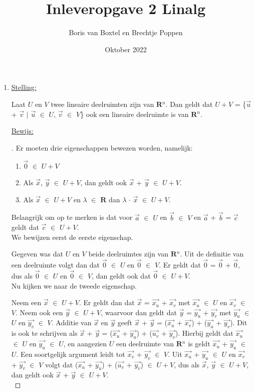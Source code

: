 \documentclass[12pt, a4paper]{article}
\title{Inleveropgave 2 Linalg}
\author{Boris van Boxtel en Brechtje Poppen}
\date{Oktober 2022}
\begin{document}
\maketitle 

\begin{enumerate}[(a.)]
\item  \underline{Stelling:} \newline 

Laat $U$ en $V$ twee lineaire deelruimten zijn van $\mathbf{R}$$^n$. Dan geldt dat $U + V$ = \{$\vec u$ + $\vec v$ $\vert$ $\vec u$ $\in$ $U$, $\vec v$ $\in$ $V$\} ook een lineaire deelruimte is van $\mathbf{R}$$^n$. \newline

\underline{Bewijs:}\begin{proof}[\unskip\nopunct]
Er moeten drie eigenschappen bewezen worden, namelijk:
\begin{enumerate}[1.]
\item $\vec{0}$ $\in$ $U + V$
\item Als $\vec{x}$, $\vec{y}$ $\in$ $U + V$, dan geldt ook $\vec{x}$ + $\vec{y}$ $\in$ $U + V$.
\item Als $\vec{x}$ $\in$ $U + V$ en $\lambda$ $\in$ $\mathbf{R}$ dan $\lambda$ $\cdot$ $\vec{x}$ $\in$ $U + V$. \\
\end{enumerate}
Belangrijk om op te merken is dat voor $\vec{a}$ $\in$ $U$ en $\vec{b}$ $\in$ $V$ en $\vec{a}$ + $\vec{b}$ = $\vec{c}$ geldt dat $\vec{c}$ $\in$ $U + V$. \\

We bewijzen eerst de eerste eigenschap. 

Gegeven was dat $U$ en $V$ beide deelruimtes zijn van $\mathbf{R}$$^n$. Uit de definitie van een deelruimte volgt dan dat $\vec{0}$ $\in$ $U$ en $\vec{0}$ $\in$ $V$. Er geldt dat $\vec{0}$ = $\vec{0}$ + $\vec{0}$, dus als $\vec{0}$ $\in$ $U$ en $\vec{0}$ $\in$ $V$, dan geldt ook dat $\vec{0}$ $\in$ $U + V$. \\

Nu kijken we naar de tweede eigenschap.

Neem een $\vec{x}$ $\in$ $U + V$. Er geldt dan dat $\vec{x}$ = $\vec{x_{u}}$ + $\vec{x_{v}}$ met $\vec{x_{u}}$ $\in$ $U$ en $\vec{x_{v}}$ $\in$ $V$. Neem ook een $\vec{y}$ $\in$ $U + V$, waarvoor dan geldt dat $\vec{y}$ = $\vec{y_{u}}$ + $\vec{y_{v}}$ met $\vec{y_{u}}$ $\in$ $U$ en $\vec{y_{v}}$ $\in$ $V$. Additie van $\vec{x}$ en $\vec{y}$ geeft $\vec{x}$ + $\vec{y}$ = ($\vec{x_{u}}$ + $\vec{x_{v}}$) + ($\vec{y_{u}}$ + $\vec{y_{v}}$). Dit is ook te schrijven als $\vec{x}$ + $\vec{y}$ = ($\vec{x_{u}}$ + $\vec{y_{u}}$) + ($\vec{u_{v}}$ + $\vec{y_{v}}$). Hierbij geldt dat $\vec{x_{u}}$ $\in$ $U$ en $\vec{y_{u}}$ $\in$ $U$, en aangezien $U$ een deelruimte van $\mathbf{R}$$^n$ is geldt $\vec{x_{u}}$ + $\vec{y_{u}}$ $\in$ $U$. Een soortgelijk argument leidt tot $\vec{x_{v}}$ + $\vec{y_{v}}$ $\in$ $V$. Uit $\vec{x_{u}}$ + $\vec{y_{u}}$ $\in$ $U$ en $\vec{x_{v}}$ + $\vec{y_{v}}$ $\in$ $V$ volgt dat ($\vec{x_{u}}$ + $\vec{y_{u}}$) + ($\vec{u_{v}}$ + $\vec{y_{v}}$) $\in$ $U + V$, dus als $\vec{x}$, $\vec{y}$ $\in$ $U + V$, dan geldt ook $\vec{x}$ + $\vec{y}$ $\in$ $U + V$. \\ 


\end{proof}
\end{enumerate}
\end{document}

